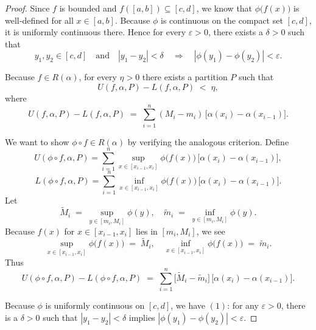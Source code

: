 \documentclass[11pt]{article}
\begin{document}
\begin{exercise}{5}
    \begin{proof}
Since $f$ is bounded and $f([a,b])\subseteq [c,d]$, we know that $\phi\bigl(f(x)\bigr)$ is well‐defined for all $x\in [a,b]$. 
Because $\phi$ is continuous on the compact set $[c,d]$, it is uniformly continuous there. 
Hence for every $\varepsilon>0$, there exists a $\delta>0$ such that
\[
y_1,y_2 \in [c,d]
\quad\text{and}\quad
|y_1-y_2| < \delta
\quad\Longrightarrow\quad
|\phi(y_1)-\phi(y_2)| < \varepsilon.
\tag{1}
\]

Because $f \in R(\alpha)$, for every $\eta>0$ there exists a partition $P$ such that 
\[
U(f,\alpha,P) - L(f,\alpha,P) \;<\;\eta,
\]
where
\[
U(f,\alpha,P) - L(f,\alpha,P)
\;=\;
\sum_{i=1}^n (M_i - m_i)\,\bigl[\alpha(x_i)-\alpha(x_{i-1})\bigr].
\tag{2}
\]

We want to show $\phi\circ f \in R(\alpha)$ by verifying the analogous criterion.  Define
\[
U(\phi\circ f,\alpha,P) 
= \sum_{i=1}^n 
\sup_{x\in [x_{i-1},x_i]}\phi\bigl(f(x)\bigr)\,\bigl[\alpha(x_i)-\alpha(x_{i-1})\bigr],
\]
\[
L(\phi\circ f,\alpha,P)
= \sum_{i=1}^n 
\inf_{x\in [x_{i-1},x_i]}\phi\bigl(f(x)\bigr)\,\bigl[\alpha(x_i)-\alpha(x_{i-1})\bigr].
\]
Let 
\[
\widetilde{M}_i 
\;=\; \sup_{y\in [m_i,M_i]}\phi(y),
\quad
\widetilde{m}_i
\;=\; \inf_{y\in [m_i,M_i]}\phi(y).
\]
Because $f(x)$ for $x\in[x_{i-1},x_i]$ lies in $[m_i,M_i]$, we see
\[
\sup_{x\in[x_{i-1},x_i]} \phi\bigl(f(x)\bigr)
\;=\; \widetilde{M}_i,
\quad
\inf_{x\in[x_{i-1},x_i]} \phi\bigl(f(x)\bigr)
\;=\; \widetilde{m}_i.
\]
Thus
\[
U(\phi\circ f,\alpha,P) 
- 
L(\phi\circ f,\alpha,P)
\;=\;
\sum_{i=1}^n \bigl[\widetilde{M}_i - \widetilde{m}_i\bigr]\,
\bigl[\alpha(x_i)-\alpha(x_{i-1})\bigr].
\tag{3}
\]

Because $\phi$ is uniformly continuous on $[c,d]$, we have \((1)\): for any $\varepsilon>0$, there is a $\delta>0$ such that $|y_1-y_2|<\delta$ implies $|\phi(y_1)-\phi(y_2)|<\varepsilon$.


\end{proof}
\end{exercise}
\end{document}
